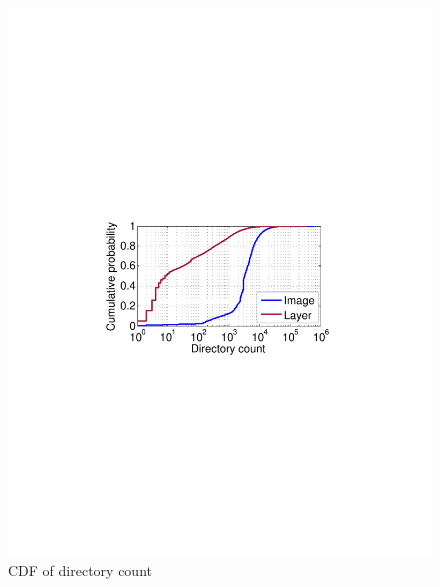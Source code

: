 \begin{figure}[t]
	\centering
	\begin{minipage}{0.22\textwidth}
		\centering
		\includegraphics[width=1\textwidth]{graphs/dir-cnt-cdf.pdf}
		\caption{CDF of directory count}
		\label{fig:dir-cnt-cdf}
	\end{minipage}%
	\begin{minipage}{0.22\textwidth}
		\centering

\end{minipage}
\end{figure}
